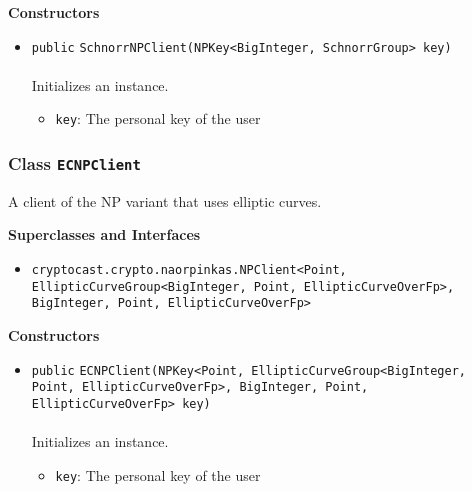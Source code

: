 \textbf{\sffamily Constructors}
\begin{itemize}
\item \lstinline|public| \lstinline|SchnorrNPClient|\lstinline|(NPKey<BigInteger, SchnorrGroup> key)|\\ \\[-0.6em]
Initializes an instance.
\begin{itemize}
\item \lstinline|key|: The personal key of the user
\end{itemize}



\end{itemize}


\subsubsection{Class \lstinline|ECNPClient|}
A client of the NP variant that uses elliptic curves. \\
\noindent\begin{minipage}[t]{5cm}
\vspace{0.3em}
\hspace*{2em}
\vspace{0.3em}
\end{minipage}



\textbf{\sffamily Superclasses and Interfaces}
\begin{itemize}
\item \lstinline|cryptocast.crypto.naorpinkas.NPClient<Point, EllipticCurveGroup<BigInteger, Point, EllipticCurveOverFp>, BigInteger, Point, EllipticCurveOverFp>|
\end{itemize}


\textbf{\sffamily Constructors}
\begin{itemize}
\item \lstinline|public| \lstinline|ECNPClient|\lstinline|(NPKey<Point, EllipticCurveGroup<BigInteger, Point, EllipticCurveOverFp>, BigInteger, Point, EllipticCurveOverFp> key)|\\ \\[-0.6em]
Initializes an instance.
\begin{itemize}
\item \lstinline|key|: The personal key of the user
\end{itemize}



\end{itemize}


